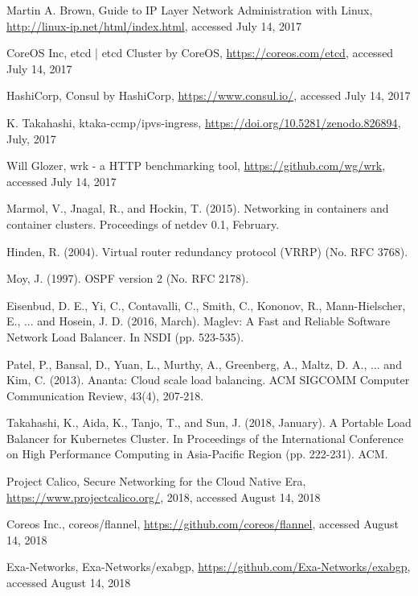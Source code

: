 \begin{thebibliography}{99}
Martin A. Brown, Guide to IP Layer Network Administration with Linux, \url{http://linux-ip.net/html/index.html}, accessed July 14, 2017

CoreOS Inc, etcd | etcd Cluster by CoreOS, \url{https://coreos.com/etcd}, accessed July 14, 2017 

HashiCorp, Consul by HashiCorp, \url{https://www.consul.io/}, accessed July 14, 2017

K. Takahashi, ktaka-ccmp/ipvs-ingress, \url{https://doi.org/10.5281/zenodo.826894}, July, 2017

Will Glozer, wrk - a HTTP benchmarking tool, \url{https://github.com/wg/wrk}, accessed July 14, 2017

Marmol, V., Jnagal, R., and Hockin, T. (2015). Networking in containers and container clusters. Proceedings of netdev 0.1, February.

Hinden, R. (2004). Virtual router redundancy protocol (VRRP) (No. RFC 3768).

Moy, J. (1997). OSPF version 2 (No. RFC 2178).

Eisenbud, D. E., Yi, C., Contavalli, C., Smith, C., Kononov, R., Mann-Hielscher, E., ... and Hosein, J. D. (2016, March). Maglev: A Fast and Reliable Software Network Load Balancer. In NSDI (pp. 523-535).

Patel, P., Bansal, D., Yuan, L., Murthy, A., Greenberg, A., Maltz, D. A., ... and Kim, C. (2013). Ananta: Cloud scale load balancing. ACM SIGCOMM Computer Communication Review, 43(4), 207-218.

Takahashi, K., Aida, K., Tanjo, T., and Sun, J. (2018, January). A Portable Load Balancer for Kubernetes Cluster. In Proceedings of the International Conference on High Performance Computing in Asia-Pacific Region (pp. 222-231). ACM.

Project Calico, Secure Networking for the Cloud Native Era, \url{https://www.projectcalico.org/}, 2018, accessed August 14, 2018

Coreos Inc., coreos/flannel, \url{https://github.com/coreos/flannel}, accessed August 14, 2018

Exa-Networks, Exa-Networks/exabgp, \url{https://github.com/Exa-Networks/exabgp}, accessed August 14, 2018


\end{thebibliography}
